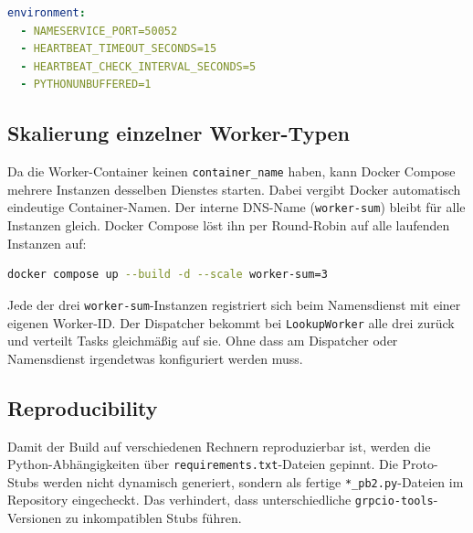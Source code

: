 \begin{lstlisting}[language=yaml,caption={Konfiguration des Namensdiensts (Ausschnitt)}]
environment:
  - NAMESERVICE_PORT=50052
  - HEARTBEAT_TIMEOUT_SECONDS=15
  - HEARTBEAT_CHECK_INTERVAL_SECONDS=5
  - PYTHONUNBUFFERED=1
\end{lstlisting}

\subsection{Skalierung einzelner Worker-Typen}

Da die Worker-Container keinen \texttt{container\_name} haben, kann Docker Compose
mehrere Instanzen desselben Dienstes starten. Dabei vergibt Docker automatisch
eindeutige Container-Namen. Der interne DNS-Name (\texttt{worker-sum}) bleibt
für alle Instanzen gleich. Docker Compose löst ihn per Round-Robin auf alle
laufenden Instanzen auf:

\begin{lstlisting}[language=bash,caption={Worker-Typ skalieren}]
docker compose up --build -d --scale worker-sum=3
\end{lstlisting}

Jede der drei \texttt{worker-sum}-Instanzen registriert sich beim Namensdienst
mit einer eigenen Worker-ID. Der Dispatcher bekommt bei \texttt{LookupWorker}
alle drei zurück und verteilt Tasks gleichmäßig auf sie. Ohne dass am
Dispatcher oder Namensdienst irgendetwas konfiguriert werden muss.

\subsection{Reproducibility}

Damit der Build auf verschiedenen Rechnern reproduzierbar ist, werden die
Python-Abhängigkeiten über \texttt{requirements.txt}-Dateien gepinnt.
Die Proto-Stubs werden nicht dynamisch generiert, sondern als fertige
\texttt{*\_pb2.py}-Dateien im Repository eingecheckt. Das verhindert, dass
unterschiedliche \texttt{grpcio-tools}-Versionen zu inkompatiblen Stubs führen.
